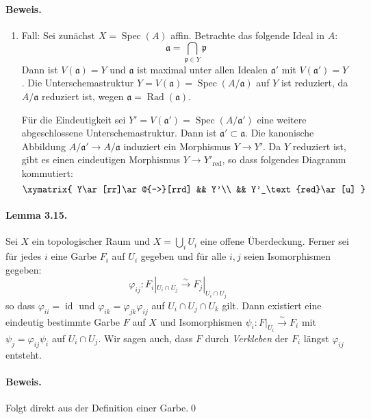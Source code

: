 \paragraph{Beweis.}
\begin{enumerate}
\item Fall: Sei zunächst $X=\operatorname{Spec}(A)$ affin. Betrachte das folgende Ideal in $A$:
\[\mathfrak{a}=\bigcap_{\mathfrak{p}\in Y}\mathfrak{p} \]
Dann ist $V(\mathfrak{a})=Y$ und $\mathfrak{a}$ ist maximal unter allen Idealen $\mathfrak{a}'$ mit $V(\mathfrak{a}')=Y$. Die Unterschemastruktur $Y=V(\mathfrak{a})=\operatorname{Spec}(A/\mathfrak{a})$ auf $Y$ ist reduziert, da $A/\mathfrak{a}$ reduziert ist, wegen $\mathfrak{a}=\operatorname{Rad}(\mathfrak{a})$.

Für die Eindeutigkeit sei $Y'=V(\mathfrak{a}')=\operatorname{Spec}(A/ \mathfrak{a}')$ eine weitere abgeschlossene Unterschemastruktur. Dann ist $\mathfrak{a}'\subset\mathfrak{a}$. Die kanonische Abbildung $A/\mathfrak{a}'\to A/\mathfrak{a}$ induziert ein Morphismus $Y\to Y'$. Da $Y$ reduziert ist, gibt es einen eindeutigen Morphismus $Y\to Y'_\text{red}$, so dass folgendes Diagramm kommutiert:
\[\xymatrix{
Y\ar[rr]\ar@{-->}[rrd] && Y'\\
&& Y'_\text{red}\ar[u]
} \]
\end{enumerate}
\fi

\paragraph{Lemma 3.15.}\label{3.15} Sei $X$ ein topologischer Raum und $X=\bigcup_i U_i$ eine offene Überdeckung. Ferner sei für jedes $i$ eine Garbe $F_i$ auf $U_i$ gegeben und für alle $i,j$ seien Isomorphismen gegeben:
\[\varphi_{ij}:F_i|_{U_i\cap U_j}\stackrel{\sim}{\to} F_j|_{U_i\cap U_j} \]
so dass $\varphi_{ii}=\operatorname{id}$ und $\varphi_{ik}=\varphi_{jk}\varphi_{ij}$ auf $U_i\cap U_j\cap U_k$ gilt. Dann existiert eine eindeutig bestimmte Garbe $F$ auf $X$ und Isomorphismen $\psi_i:F|_{U_i}\stackrel{\sim}{\to}F_i$ mit $\psi_j=\varphi_{ij}\psi_i$ auf $U_i\cap U_j$. Wir sagen auch, dass $F$ durch \textit{Verkleben} der $F_i$ längst $\varphi_{ij}$ entsteht.

\paragraph{Beweis.} Folgt direkt aus der Definition einer Garbe.\qed

